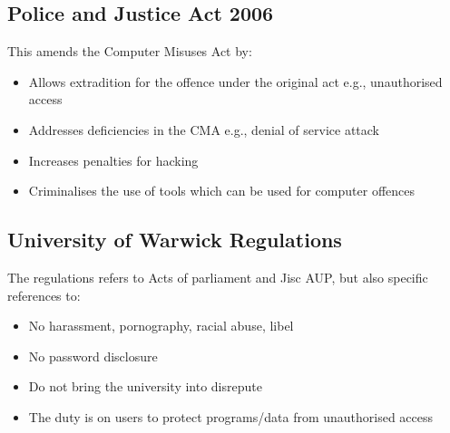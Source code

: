\documentclass[a4paper]{article}
\theoremstyle{plain}
\theoremstyle{definition}
\theoremstyle{remark}
\begin{document}
\subsection{Police and Justice Act 2006}
This amends the Computer Misuses Act by:
\begin{itemize}
	\item Allows extradition for the offence under the original act e.g., unauthorised access
	\item Addresses deficiencies in the CMA e.g., denial of service attack
	\item Increases penalties for hacking
	\item Criminalises the use of tools which can be used for computer offences
\end{itemize}
\subsection{University of Warwick Regulations}
The regulations refers to Acts of parliament and Jisc AUP, but also specific references to:
\begin{itemize}
	\item No harassment, pornography, racial abuse, libel
	\item No password disclosure
	\item Do not bring the university into disrepute
	\item The duty is on users to protect programs/data from unauthorised access
\end{itemize}
\end{document}
